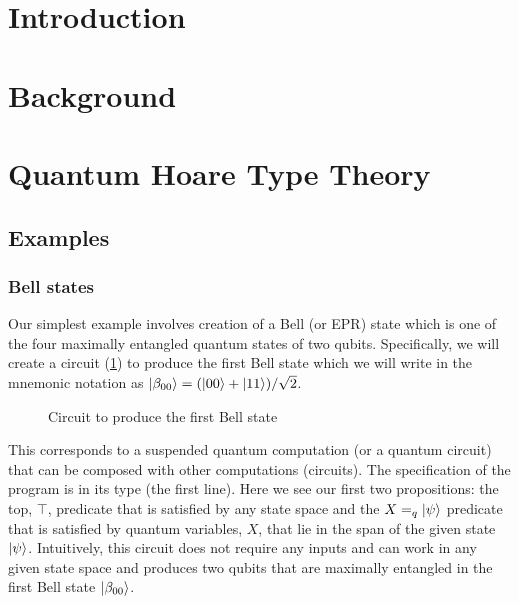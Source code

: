 \documentclass[adraft,creativecommons]{eptcs}
\title{\titlerunning}
\author{
Kartik Singhal
\institute{University of Chicago}
\email{\mailtodomain{ks@cs.uchicago.edu}}
}
\begin{document}
\maketitle

\section{Introduction}

\section{Background}

\section{Quantum Hoare Type Theory}

\subsection{Examples}

\subsubsection{Bell states}

Our simplest example involves creation of a Bell (or EPR) state which is one of the four maximally entangled quantum states of two qubits. Specifically, we will create a circuit (\cref{fig:bell00}) to produce the first Bell state which we will write in the mnemonic notation as $\ket{\beta_{00}} = (\ket{00}+\ket{11})/\sqrt{2}$.

\begin{figure}
    \centering
    \caption{Circuit to produce the first Bell state}
    \label{fig:bell00}
\end{figure}



This corresponds to a suspended quantum computation (or a quantum circuit) that can be composed with other computations (circuits). The specification of the program is in its type (the first line). Here we see our first two propositions: the top, $\top$, predicate that is satisfied by any state space and the $X =_q \ket{\psi}$ predicate that is satisfied by quantum variables, $X$, that lie in the span of the given state $\ket{\psi}$. Intuitively, this circuit does not require any inputs and can work in any given state space and produces two qubits that are maximally entangled in the first Bell state $\ket{\beta_{00}}$.
\end{document}
